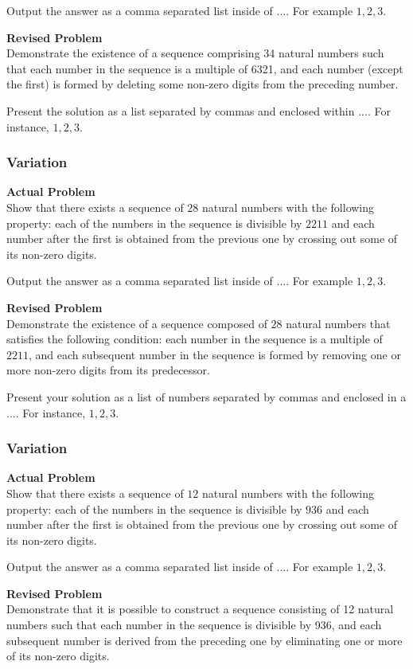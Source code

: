 Output the answer as a comma separated list inside of $\boxed{...}$. For example $\boxed{1, 2, 3}$.

\textbf{Revised Problem}\\
Demonstrate the existence of a sequence comprising 34 natural numbers such that each number in the sequence is a multiple of 6321, and each number (except the first) is formed by deleting some non-zero digits from the preceding number.

Present the solution as a list separated by commas and enclosed within $\boxed{...}$. For instance, $\boxed{1, 2, 3}$.

\subsubsection{Variation}
\textbf{Actual Problem}\\
Show that there exists a sequence of $28$ natural numbers with the following property: each of the numbers in the sequence is divisible by $2211$ and each number after the first is obtained from the previous one by crossing out some of its non-zero digits.

Output the answer as a comma separated list inside of $\boxed{...}$. For example $\boxed{1, 2, 3}$.

\textbf{Revised Problem}\\
Demonstrate the existence of a sequence composed of $28$ natural numbers that satisfies the following condition: each number in the sequence is a multiple of $2211$, and each subsequent number in the sequence is formed by removing one or more non-zero digits from its predecessor.

Present your solution as a list of numbers separated by commas and enclosed in a $\boxed{...}$. For instance, $\boxed{1, 2, 3}$.

\subsubsection{Variation}
\textbf{Actual Problem}\\
Show that there exists a sequence of $12$ natural numbers with the following property: each of the numbers in the sequence is divisible by $936$ and each number after the first is obtained from the previous one by crossing out some of its non-zero digits.

Output the answer as a comma separated list inside of $\boxed{...}$. For example $\boxed{1, 2, 3}$.

\textbf{Revised Problem}\\
Demonstrate that it is possible to construct a sequence consisting of 12 natural numbers such that each number in the sequence is divisible by 936, and each subsequent number is derived from the preceding one by eliminating one or more of its non-zero digits.

